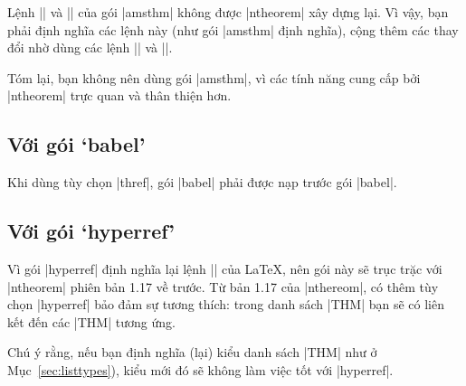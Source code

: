 \medskip
Lệnh |\newtheoremstyle| và |\swapnumbers| của gói |amsthm| không
được |ntheorem| xây dựng lại. Vì vậy,
bạn phải định nghĩa các lệnh này (như gói |amsthm| định nghĩa),
cộng thêm các thay đổi nhờ dùng các lệnh |\theoremheaderfont|
và |\theorembodyfont|.

\medskip
Tóm lại, bạn không nên dùng gói |amsthm|, vì các tính năng
cung cấp bởi |ntheorem| trực quan và thân thiện hơn.

\subsection{Với gói `babel'}\label{sec:babel}

Khi dùng tùy chọn |thref|, gói |babel| phải được nạp trước gói |babel|.

\subsection{\texorpdfstring{Với gói}{Voi goi} `hyperref'}
\label{sec:hyperref}

Vì gói |hyperref| định nghĩa lại lệnh |\contentsline| của \LaTeX{},
nên gói này sẽ trục trặc với |ntheorem| phiên bản 1.17 về trước.
Từ bản 1.17 của |nthereom|, có thêm tùy chọn |hyperref| bảo đảm
sự tương thích: trong danh sách |THM| bạn sẽ có liên kết đến các |THM| tương ứng.

\medskip
Chú ý rằng,
nếu bạn định nghĩa (lại) kiểu danh sách |THM| như ở Mục~\vref{sec:listtypes}),
kiểu mới đó sẽ không làm việc tốt với |hyperref|.

\endinput
